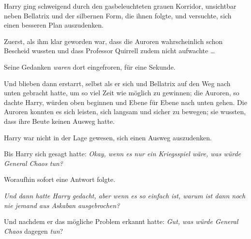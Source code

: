 \later

Harry ging schweigend durch den gasbeleuchteten grauen Korridor, unsichtbar neben Bellatrix und der silbernen Form, die ihnen folgte, und versuchte, sich einen besseren Plan auszudenken.

Zuerst, als ihm klar geworden war, dass die Auroren wahrscheinlich schon Bescheid wussten und dass Professor Quirrell zudem nicht aufwachte …

Seine Gedanken \emph{waren} dort eingefroren, für eine Sekunde.

Und blieben dann erstarrt, selbst als er sich und Bellatrix auf den Weg nach unten gebracht hatte, um so viel Zeit wie möglich zu gewinnen; die Auroren, so dachte Harry, würden oben beginnen und Ebene für Ebene nach unten gehen. Die Auroren konnten es sich leisten, sich langsam und sicher zu bewegen; sie wussten, dass ihre Beute keinen Ausweg hatte.

Harry war nicht in der Lage gewesen, sich einen Ausweg auszudenken.

Bis Harry sich gesagt hatte: \emph{Okay, wenn es nur ein Kriegsspiel wäre, was würde General Chaos tun?}

Woraufhin sofort eine Antwort folgte.

\emph{Und dann hatte Harry gedacht, \emph{aber wenn es} so \emph{einfach ist, warum ist} \emph{dann} \emph{noch nie jemand aus Askaban ausgebrochen?}}

Und nachdem er das mögliche Problem erkannt hatte: \emph{Gut, was würde General Chaos} dagegen \emph{tun}?

